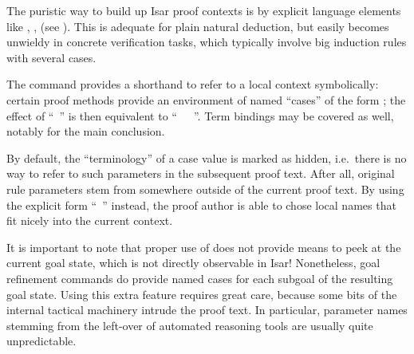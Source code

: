 \begin{isabellebody}
\begin{isamarkuptext}
  The puristic way to build up Isar proof contexts is by explicit
  language elements like \hyperlink{command.fix}{\mbox{}}, \hyperlink{command.assume}{\mbox{}},
  \hyperlink{command.let}{\mbox{}} (see ).  This is adequate
  for plain natural deduction, but easily becomes unwieldy in concrete
  verification tasks, which typically involve big induction rules with
  several cases.

  The \hyperlink{command.case}{\mbox{}} command provides a shorthand to refer to a
  local context symbolically: certain proof methods provide an
  environment of named ``cases'' of the form ; the effect of ``\hyperlink{command.case}{\mbox{}}~'' is then equivalent to ``\hyperlink{command.fix}{\mbox{}}~~\hyperlink{command.assume}{\mbox{}}~''.  Term bindings may be covered as well, notably
  \hyperlink{variable.?case}{\mbox{}} for the main conclusion.

  By default, the ``terminology''  of
  a case value is marked as hidden, i.e.\ there is no way to refer to
  such parameters in the subsequent proof text.  After all, original
  rule parameters stem from somewhere outside of the current proof
  text.  By using the explicit form ``\hyperlink{command.case}{\mbox{}}~'' instead, the proof author is able to
  chose local names that fit nicely into the current context.

  \medskip It is important to note that proper use of \hyperlink{command.case}{\mbox{}} does not provide means to peek at the current goal state,
  which is not directly observable in Isar!  Nonetheless, goal
  refinement commands do provide named cases 
  for each subgoal  of the resulting goal state.
  Using this extra feature requires great care, because some bits of
  the internal tactical machinery intrude the proof text.  In
  particular, parameter names stemming from the left-over of automated
  reasoning tools are usually quite unpredictable.


\end{isamarkuptext}
\end{isabellebody}
